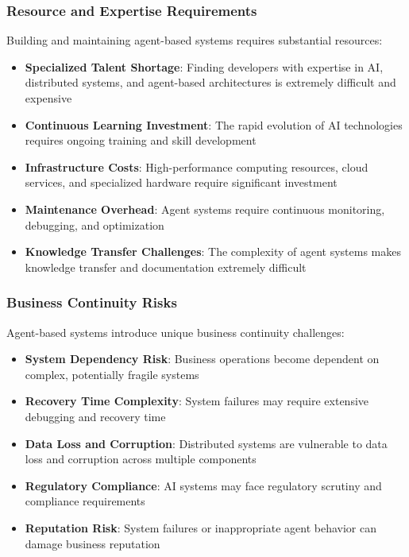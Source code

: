 \subsubsection{Resource and Expertise Requirements}

Building and maintaining agent-based systems requires substantial resources:

\begin{itemize}
    \item \textbf{Specialized Talent Shortage}: Finding developers with expertise in AI, distributed systems, and agent-based architectures is extremely difficult and expensive
    \item \textbf{Continuous Learning Investment}: The rapid evolution of AI technologies requires ongoing training and skill development
    \item \textbf{Infrastructure Costs}: High-performance computing resources, cloud services, and specialized hardware require significant investment
    \item \textbf{Maintenance Overhead}: Agent systems require continuous monitoring, debugging, and optimization
    \item \textbf{Knowledge Transfer Challenges}: The complexity of agent systems makes knowledge transfer and documentation extremely difficult
\end{itemize}

\subsubsection{Business Continuity Risks}

Agent-based systems introduce unique business continuity challenges:

\begin{itemize}
    \item \textbf{System Dependency Risk}: Business operations become dependent on complex, potentially fragile systems
    \item \textbf{Recovery Time Complexity}: System failures may require extensive debugging and recovery time
    \item \textbf{Data Loss and Corruption}: Distributed systems are vulnerable to data loss and corruption across multiple components
    \item \textbf{Regulatory Compliance}: AI systems may face regulatory scrutiny and compliance requirements
    \item \textbf{Reputation Risk}: System failures or inappropriate agent behavior can damage business reputation
\end{itemize}

